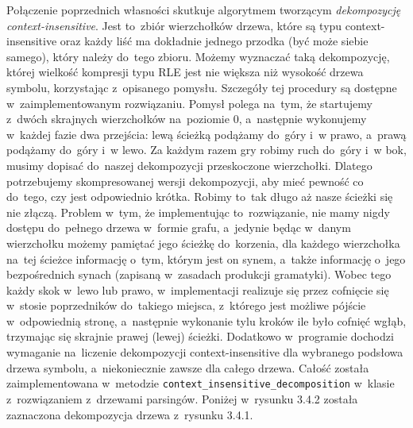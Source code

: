 \documentclass[declaration,shortabstract]{iithesis}
\theoremstyle{definition} \newtheorem{definition}{Definicja}[chapter]
\theoremstyle{remark} \newtheorem{remark}[definition]{Obserwacja}
\theoremstyle{plain} \newtheorem{theorem}[definition]{Twierdzenie}
\theoremstyle{remark} \newtheorem{example}{Przykład}[definition]
\theoremstyle{plain} \newtheorem{lemma}[definition]{Lemat}
\begin{document}
Połączenie poprzednich własności skutkuje algorytmem tworzącym \textit{dekompozycję context-insensitive}. Jest to~zbiór wierzchołków drzewa, które są typu context-insensitive oraz każdy liść ma dokładnie jednego przodka (być może siebie samego), który należy do~tego zbioru. Możemy wyznaczać taką dekompozycję, której wielkość kompresji typu RLE jest nie większa niż wysokość drzewa symbolu, korzystając z~opisanego pomysłu. Szczegóły tej procedury są dostępne w~zaimplementowanym rozwiązaniu. Pomysł polega na~tym, że startujemy z~dwóch skrajnych wierzchołków na~poziomie $0$, a~następnie wykonujemy w~każdej fazie dwa przejścia: lewą ścieżką podążamy do~góry i~w prawo, a~prawą podążamy do~góry i~w lewo. Za każdym razem gry robimy ruch do~góry i~w bok, musimy dopisać do~naszej dekompozycji przeskoczone wierzchołki. Dlatego potrzebujemy skompresowanej wersji dekompozycji, aby mieć pewność co do~tego, czy jest odpowiednio krótka. Robimy to~tak długo aż nasze ścieżki się nie złączą. Problem w~tym, że implementując to~rozwiązanie, nie mamy nigdy dostępu do~pełnego drzewa w~formie grafu, a~jedynie będąc w~danym wierzchołku możemy pamiętać jego ścieżkę do~korzenia, dla każdego wierzchołka na~tej ścieżce informację o~tym, którym jest on synem, a~także informację o~jego bezpośrednich synach (zapisaną w~zasadach produkcji gramatyki). Wobec tego każdy skok w~lewo lub prawo, w~implementacji realizuje się przez cofnięcie się w~stosie poprzedników do~takiego miejsca, z~którego jest możliwe pójście w~odpowiednią stronę, a~następnie wykonanie tylu kroków ile było cofnięć wgłąb, trzymając się skrajnie prawej (lewej) ścieżki. Dodatkowo w~programie dochodzi wymaganie na~liczenie dekompozycji context-insensitive dla wybranego podsłowa drzewa symbolu, a~niekoniecznie zawsze dla całego drzewa. Całość została zaimplementowana w~metodzie \texttt{context\_insensitive\_decomposition} w~klasie z~rozwiązaniem z~drzewami parsingów. Poniżej w~rysunku 3.4.2 została zaznaczona dekompozycja drzewa z~rysunku 3.4.1.
\end{document}
